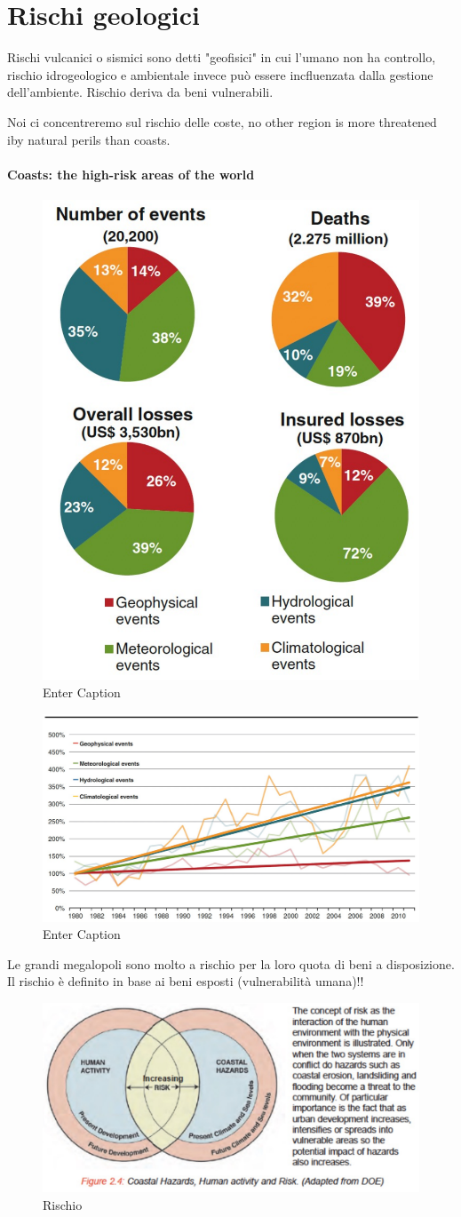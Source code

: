 \section{Rischi geologici}
Rischi vulcanici o sismici sono detti "geofisici" in cui l'umano non ha controllo, rischio idrogeologico e ambientale invece può essere incfluenzata dalla gestione dell'ambiente. Rischio deriva da beni vulnerabili.


Noi ci concentreremo sul rischio delle coste, no other region is more threatened iby natural perils than coasts.
\paragraph{Coasts: the high-risk areas of the world}
\begin{figure}[htpb]
    \centering
    \includegraphics[width=0.5\linewidth]{uploads/paper1.png}
    \caption{Enter Caption}
    \label{fig:enter-label}
\end{figure}

\begin{figure}[htpb]
    \centering
    \includegraphics[width=0.5\linewidth]{uploads/paper 2.png}
    \caption{Enter Caption}
    \label{fig:enter-label}
\end{figure}
Le grandi megalopoli sono molto a rischio per la loro quota di beni a disposizione. Il rischio è definito in base ai beni esposti (vulnerabilità umana)!!
\begin{figure}[htpb]
    \centering
    \includegraphics[width=0.5\linewidth]{uploads/rischio.png}
    \caption{Rischio}
\end{figure}
